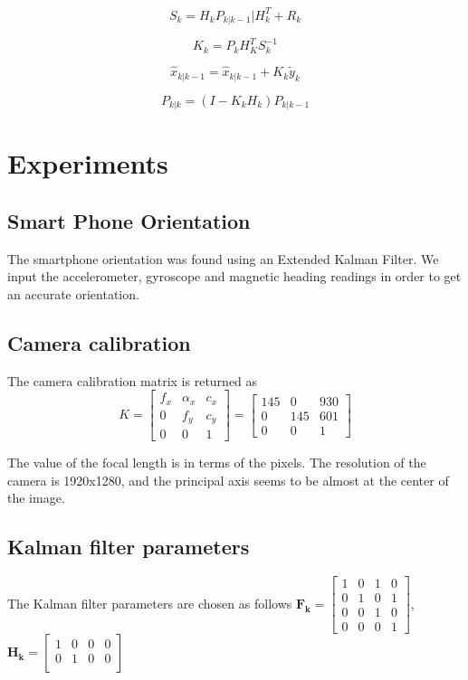 \documentclass[12pt,twocolumn,letterpaper]{article}
\begin{document}
\begin{equation}
S_k = H_kP_{k|k-1}|H_k^T + R_k
\label{eqn:covr}
\end{equation}

\begin{equation}
K_k = P_{k}H_K^TS_k^{-1}
\label{eqn:ekf-gain}
\end{equation}

\begin{equation}
\hat{x}_{k|k-1} = \hat{x}_{k|k-1} + K_k\tilde{y}_k
\label{eqn:ekf-updateState}
\end{equation}

\begin{equation}
P_{k|k} = (I - K_kH_k)P_{k|k-1}
\label{eqn:ekf-updateCov}
\end{equation}

\section{Experiments}
\subsection{Smart Phone Orientation}
The smartphone orientation was found using an Extended Kalman Filter.  We input the accelerometer, gyroscope and magnetic heading readings in order to get an accurate orientation.

\subsection{Camera calibration}
The camera calibration matrix is returned as
\begin{equation}
K = \begin{bmatrix}
f_x & \alpha_x & c_x\\
0 & f_y &  c_y\\
0 & 0 & 1
\end{bmatrix} = \begin{bmatrix}
145 & 0 & 930\\
 0 &145 & 601\\
0 & 0 & 1
\end{bmatrix}
\end{equation}

The value of the focal length is in terms of the pixels. The resolution of the camera is 1920x1280, and the principal axis seems to be almost at the center of the image.

\subsection{Kalman filter parameters}
The Kalman filter parameters are chosen as follows
$ \mathbf{F_k} = \begin{bmatrix}
1 & 0 & 1 & 0\\
0 & 1 & 0 & 1\\
0 & 0 & 1 & 0\\
0 & 0 & 0 & 1
\end{bmatrix} $,
$ \mathbf{H_k} = \begin{bmatrix}
1 & 0 & 0 & 0\\
0 & 1 & 0 & 0\\
\end{bmatrix} $
\end{document}
